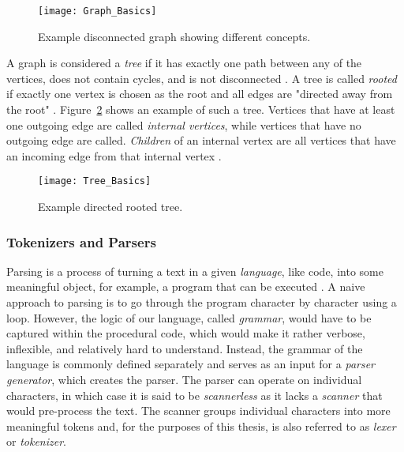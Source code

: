 \begin{figure}[H]
    \centering
    \texttt{[image: Graph\_Basics]}
    \caption{Example disconnected graph showing different concepts.}
    \label{fig:text-graph-basics}
\end{figure}

A graph is considered a \emph{tree} if it has exactly one path between any of the vertices, does not contain cycles, and is not disconnected \parencite{wilson_graph_2009}.
A tree is called \emph{rooted} if exactly one vertex is chosen as the root and all edges are "directed away from the root" \parencite{Baek_trees_2015}.
Figure~\ref{fig:text-tree-basics} shows an example of such a tree.
Vertices that have at least one outgoing edge are called \emph{internal vertices}, while vertices that have no outgoing edge are called.
\emph{Children} of an internal vertex are all vertices that have an incoming edge from that internal vertex \parencite{Baek_trees_2015}.

\begin{figure}[H]
    \centering
    \texttt{[image: Tree\_Basics]}
    \caption{Example directed rooted tree.}
    \label{fig:text-tree-basics}
\end{figure}

\subsubsection{Tokenizers and Parsers}


Parsing is a process of turning a text in a given \emph{language}, like code, into some meaningful object, for example, a program that can be executed \parencites{tomassetti_parsing_2017}{Kjolstad_parsing_2023}.
A naive approach to parsing is to go through the program character by character using a loop.
However, the logic of our language, called \emph{grammar}, would have to be captured within the procedural code, which would make it rather verbose, inflexible, and relatively hard to understand.
Instead, the grammar of the language is commonly defined separately and serves as an input for a \emph{parser generator}, which creates the parser.
The parser can operate on individual characters, in which case it is said to be \emph{scannerless} as it lacks a \emph{scanner} that would pre-process the text.
The scanner groups individual characters into more meaningful tokens and, for the purposes of this thesis, is also referred to as \emph{lexer} or \emph{tokenizer}.


